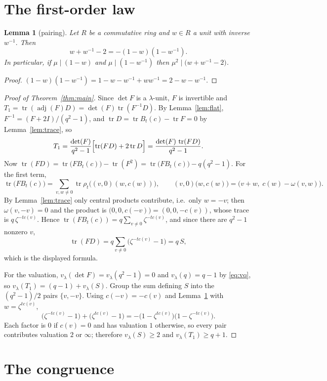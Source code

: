 \documentclass[11pt]{article}
\theoremstyle{plain}
\newtheorem{lemma}[theorem]{Lemma}
\theoremstyle{definition}
\newcommand{\adj}{\operatorname{adj}}
\newcommand{\tr}{\operatorname{tr}}
\newcommand{\vlam}{v_\lambda}
\begin{document}
\section{The first-order law}

\begin{lemma}[pairing]\label{lem:pair}
Let $R$ be a commutative ring and $w\in R$ a unit with inverse $w^{-1}$. Then
\[
w+w^{-1}-2=-(1-w)(1-w^{-1}).
\]
In particular, if $\mu\mid(1-w)$ and $\mu\mid(1-w^{-1})$ then
$\mu^2\mid\bigl(w+w^{-1}-2\bigr)$.
\end{lemma}

\begin{proof}
$(1-w)(1-w^{-1})=1-w-w^{-1}+ww^{-1}=2-w-w^{-1}$.
\end{proof}

\begin{proof}[Proof of Theorem~\ref{thm:main}]
Since $\det F$ is a $\lambda$-unit, $F$ is invertible and
$T_1=\tr(\adj(F)D)=\det(F)\tr(F^{-1}D)$. By Lemma~\ref{lem:flat},
$F^{-1}=(F+2I)/(q^2-1)$, and $\tr D=\tr B_t(c)-\tr F=0$ by
Lemma~\ref{lem:trace}, so
\[
T_1=\frac{\det(F)}{q^2-1}\Bigl[\tr(FD)+2\tr D\Bigr]
   =\frac{\det(F)\,\tr(FD)}{q^2-1}.
\]
Now $\tr(FD)=\tr\bigl(FB_t(c)\bigr)-\tr(F^2)=\tr\bigl(FB_t(c)\bigr)-q(q^2-1)$.
For the first term,
\[
\tr\bigl(FB_t(c)\bigr)
=\sum_{v,w\neq0}\tr\rho_t\bigl((v,0)(w,c(w))\bigr),
\qquad
(v,0)\bigl(w,c(w)\bigr)=\bigl(v+w,\;c(w)-\omega(v,w)\bigr).
\]
By Lemma~\ref{lem:trace} only central products contribute, i.e.\ only $w=-v$;
then $\omega(v,-v)=0$ and the product is $\bigl(0,0,c(-v)\bigr)=(0,0,-c(v))$,
whose trace is $q\,\zeta^{-tc(v)}$. Hence
$\tr(FB_t(c))=q\sum_{v\neq0}\zeta^{-tc(v)}$, and since there are $q^2-1$
nonzero $v$,
\[
\tr(FD)=q\sum_{v\neq0}\bigl(\zeta^{-tc(v)}-1\bigr)=q\,S,
\]
which is the displayed formula.

For the valuation, $\vlam(\det F)=\vlam(q^2-1)=0$ and $\vlam(q)=q-1$ by
\eqref{eq:vq}, so $\vlam(T_1)=(q-1)+\vlam(S)$. Group the sum defining $S$ into
the $(q^2-1)/2$ pairs $\{v,-v\}$. Using $c(-v)=-c(v)$ and
Lemma~\ref{lem:pair} with $w=\zeta^{tc(v)}$,
\[
\bigl(\zeta^{-tc(v)}-1\bigr)+\bigl(\zeta^{tc(v)}-1\bigr)
=-\bigl(1-\zeta^{tc(v)}\bigr)\bigl(1-\zeta^{-tc(v)}\bigr).
\]
Each factor is $0$ if $c(v)=0$ and has valuation $1$ otherwise, so every pair
contributes valuation $2$ or $\infty$; therefore $\vlam(S)\ge2$ and
$\vlam(T_1)\ge q+1$.
\end{proof}

\section{The congruence}\label{sec:sharp}
\end{document}
